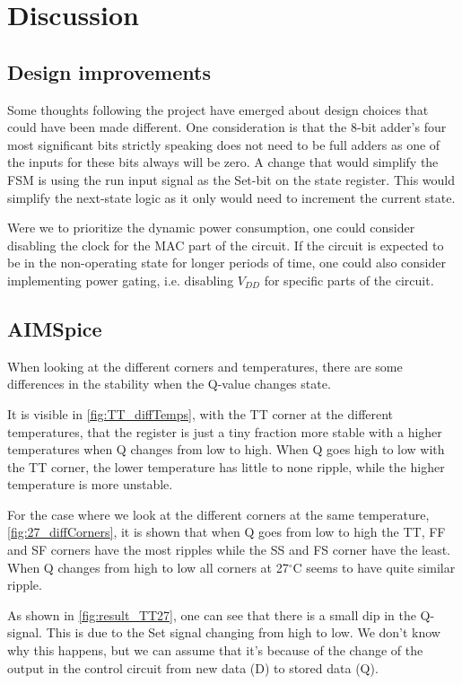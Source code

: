 \section{Discussion}
\label{sec: Discussion}

\subsection{Design improvements}

Some thoughts following the project have emerged about design choices that could have been made different. One consideration is that the 8-bit adder's four most significant bits strictly speaking does not need to be full adders as one of the inputs for these bits always will be zero. A change that would simplify the FSM is using the run input signal as the Set-bit on the state register. This would simplify the next-state logic as it only would need to increment the current state.

Were we to prioritize the dynamic power consumption, one could consider disabling the clock for the MAC part of the circuit. If the circuit is expected to be in the non-operating state for longer periods of time, one could also consider implementing power gating, i.e. disabling $V_{DD}$ for specific parts of the circuit.

\subsection{AIMSpice}

When looking at the different corners and temperatures, there are some differences in the stability when the Q-value changes state. 

It is visible in \autoref{fig:TT_diffTemps}, with the TT corner at the different temperatures, that the register is just a tiny fraction more stable with a higher temperatures when Q changes from low to high. When Q goes high to low with the TT corner, the lower temperature has little to none ripple, while the higher temperature is more unstable. 

For the case where we look at the different corners at the same temperature, \autoref{fig:27_diffCorners}, it is shown that when Q goes from low to high the TT, FF and SF corners have the most ripples while the SS and FS corner have the least. When Q changes from high to low all corners at 27$^\circ$C seems to have quite similar ripple. 

As shown in \autoref{fig:result_TT27}, one can see that there is a small dip in the Q-signal. This is due to the Set signal changing from high to low. We don't know why this happens, but we can assume that it's because of the change of the output in the control circuit from new data (D) to stored data (Q).

